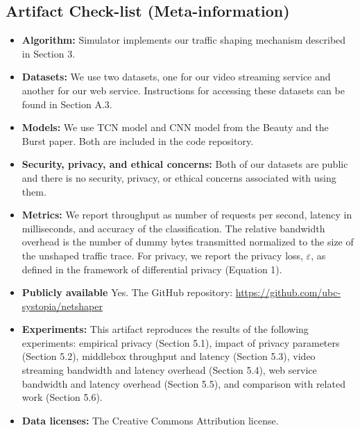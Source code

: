 \subsection{Artifact Check-list (Meta-information)}
\label{subsec:artifact-checklist}
\begin{itemize}
  \setlength{\itemsep}{1pt}
  \item \textbf{Algorithm:} Simulator implements our traffic shaping mechanism described in Section 3.
  \item \textbf{Datasets:} We use two datasets, one for our video streaming service and another for our web service. Instructions for accessing these datasets can be found in Section A.3.
  \item \textbf{Models:} We use TCN model and CNN model from the Beauty and the Burst paper. Both are included in the code repository.
  \item \textbf{Security, privacy, and ethical concerns:} Both of our datasets are public and there is no security, privacy, or ethical concerns associated with using them.
  \item \textbf{Metrics:} We report throughput as number of requests per second, latency in milliseconds, and accuracy of the classification. The relative bandwidth overhead is the number of dummy bytes transmitted normalized to the size of the unshaped traffic trace. For privacy, we report the privacy loss, $\varepsilon$, as defined in the framework of differential privacy (Equation 1).    
  \item \textbf{Publicly available } Yes. The GitHub repository: \href{https://github.com/ubc-systopia/netshaper}{https://github.com/ubc-systopia/netshaper}
  \item \textbf{Experiments:} This artifact reproduces the results of the following experiments: empirical privacy (Section 5.1), impact of privacy parameters (Section 5.2),  middlebox throughput and latency (Section 5.3), video streaming bandwidth and latency overhead (Section 5.4), web service bandwidth and latency overhead (Section 5.5), and comparison with related work (Section 5.6).  
  \item \textbf{Data licenses:} The Creative Commons Attribution license.
\end{itemize}

